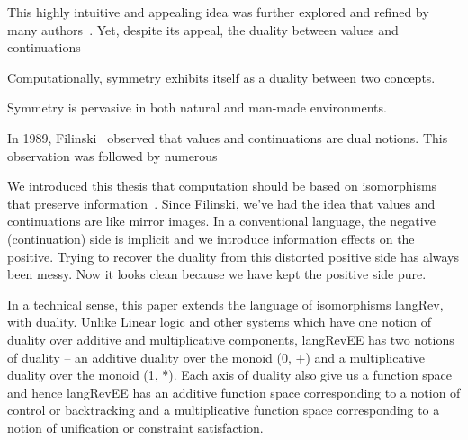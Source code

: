 \documentclass[preprint]{sigplanconf}
\begin{document}
This highly intuitive and appealing idea was further explored and refined by
many authors~\cite{Griffin:1989:FNC:96709.96714, Curien:2000,
  Wadler:2003, DBLP:conf/rta/Wadler05}. Yet, despite its appeal, the duality
between values and continuations 

Computationally, symmetry exhibits itself as a duality between two concepts.

Symmetry is pervasive in both natural and man-made environments. 

In 1989, Filinski~\cite{Filinski:1989:DCI:648332.755574} observed that values
and continuations are dual notions. This observation was followed by numerous

We introduced this thesis that computation should be based on isomorphisms
that preserve information~\cite{infeffects}. Since Filinski, we've had the
idea that values and continuations are like mirror images. In a conventional
language, the negative (continuation) side is implicit and we introduce
information effects on the positive. Trying to recover the duality from this
distorted positive side has always been messy. Now it looks clean because we
have kept the positive side pure.

In a technical sense, this paper extends the language of isomorphisms
{{langRev}}, with duality. Unlike Linear logic \cite{Girard87tcs} and
other systems which have one notion of duality over additive and
multiplicative components, {{langRevEE}} has two notions of duality
-- an additive duality over the monoid {{(0, +)}} and a multiplicative
duality over the monoid {{(1, *)}}. Each axis of duality also give us
a function space and hence {{langRevEE}} has an additive function
space corresponding to a notion of control or backtracking and a
multiplicative function space corresponding to a notion of unification
or constraint satisfaction.
\end{document}
